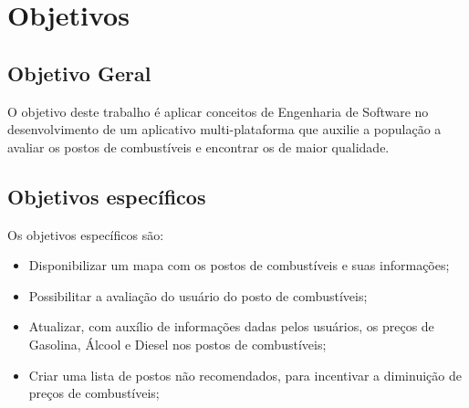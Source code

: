 \section{Objetivos}

\subsection{Objetivo Geral}

O objetivo deste trabalho é aplicar conceitos de Engenharia de Software no desenvolvimento de um aplicativo multi-plataforma que auxilie a população a avaliar os postos de combustíveis e encontrar os de maior qualidade.

\subsection{Objetivos específicos}

Os objetivos específicos são:
\begin{itemize}
    \item Disponibilizar um mapa com os postos de combustíveis e suas informações;
    \item Possibilitar a avaliação do usuário do posto de combustíveis;
    \item Atualizar, com auxílio de informações dadas pelos usuários, os preços de Gasolina, Álcool e Diesel nos postos de combustíveis;
    \item Criar uma lista de postos não recomendados, para incentivar a diminuição de preços de combustíveis;
\end{itemize}
